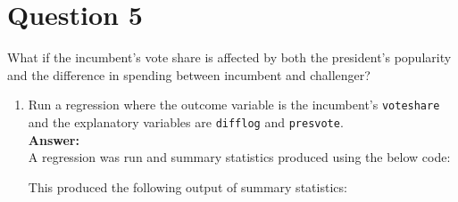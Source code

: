 \documentclass[12pt,letterpaper]{article}
\begin{document}
\section*{Question 5}
\noindent What if the incumbent's vote share is affected by both the president's popularity and the difference in spending between incumbent and challenger? 
	\begin{enumerate}
		\item Run a regression where the outcome variable is the incumbent's \texttt{voteshare} and the explanatory variables are \texttt{difflog} and \texttt{presvote}.\\
		
		\textbf{Answer:}\\
		
		A regression was run and summary statistics produced using the below code:
		
		\vspace{.5cm}
		
		  
		
		\vspace{.5cm}
		
		This produced the following output of summary statistics:
		
		\vspace{.4cm}
		

\end{enumerate}
\end{document}
